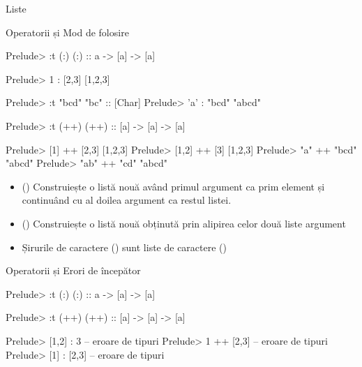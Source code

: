 \documentclass[xcolor=pdftex,romanian,colorlinks]{beamer}
\begin{document}
\begin{section}{Liste}

\begin{frame}[fragile]{Operatorii \structure{:} și \structure{++}}{Mod de folosire}
\vspace{-3ex}
\begin{minipage}[t]{.49\columnwidth}
\begin{asciihs}
Prelude> :t (:)
(:) :: a -> [a] -> [a]

Prelude> 1 : [2,3]
[1,2,3]


Prelude> :t "bcd"
"bc" :: [Char]
Prelude> 'a' : "bcd"
"abcd"
\end{asciihs}
\end{minipage}
\begin{minipage}[t]{.49\columnwidth}
\begin{asciihs}
Prelude> :t (++)
(++) :: [a] -> [a] -> [a]

Prelude> [1] ++ [2,3]
[1,2,3]
Prelude> [1,2] ++ [3]
[1,2,3]
Prelude> "a" ++ "bcd"
"abcd"
Prelude> "ab" ++ "cd"
"abcd"
\end{asciihs}
\end{minipage}
\begin{itemize}
\item[:] () Construiește o listă nouă având primul argument ca prim element și continuând cu al doilea argument ca restul listei.
\item[++] () Construiește o listă nouă obținută prin alipirea celor două liste argument
\item[\texttt{\footnotesize [Char]}] Șirurile de caractere () sunt liste de caractere ()
\end{itemize}

\end{frame}

\begin{frame}[fragile]{Operatorii \structure{:} și \structure{++}}{Erori de începător}
\begin{asciihs}
Prelude> :t (:)
(:) :: a -> [a] -> [a]

Prelude> :t (++)
(++) :: [a] -> [a] -> [a]

\end{asciihs}

\begin{minipage}[t]{.49\columnwidth}
\begin{asciihs}
Prelude> [1,2] : 3
  -- eroare de tipuri
Prelude> 1 ++ [2,3]
  -- eroare de tipuri
Prelude> [1] : [2,3]
  -- eroare de tipuri
\end{asciihs}


\end{minipage}
\end{frame}
\end{section}
\end{document}
